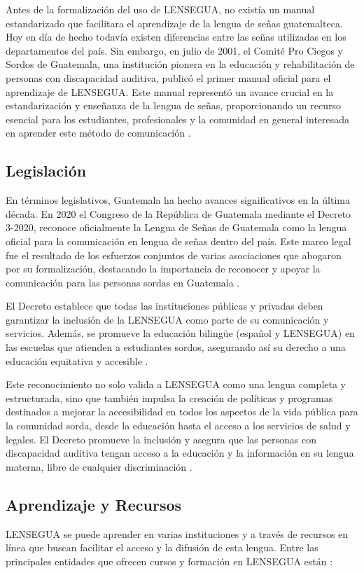 Antes de la formalización del uso de LENSEGUA, no existía un manual estandarizado que facilitara el aprendizaje de la lengua de señas guatemalteca. Hoy en día de hecho todavía existen diferencias entre las señas utilizadas en los departamentos del país. Sin embargo, en julio de 2001, el Comité Pro Ciegos y Sordos de Guatemala, una institución pionera en la educación y rehabilitación de personas con discapacidad auditiva, publicó el primer manual oficial para el aprendizaje de LENSEGUA. Este manual representó un avance crucial en la estandarización y enseñanza de la lengua de señas, proporcionando un recurso esencial para los estudiantes, profesionales y la comunidad en general interesada en aprender este método de comunicación \cite{deLeon2021}.

\subsection{Legislación}
En términos legislativos, Guatemala ha hecho avances significativos en la última década. En 2020 el Congreso de la República de Guatemala mediante el Decreto 3-2020, reconoce oficialmente la Lengua de Señas de Guatemala como la lengua oficial para la comunicación en lengua de señas dentro del país. Este marco legal fue el resultado de los esfuerzos conjuntos de varias asociaciones que abogaron por su formalización, destacando la importancia de reconocer y apoyar la comunicación para las personas sordas en Guatemala \cite{CongresoGuatemala2020} .

El Decreto establece que todas las instituciones públicas y privadas deben garantizar la inclusión de la LENSEGUA como parte de su comunicación y servicios. Además, se promueve la educación bilingüe (español y LENSEGUA) en las escuelas que atienden a estudiantes sordos, asegurando así su derecho a una educación equitativa y accesible \cite{CongresoGuatemala2020}.

Este reconocimiento no solo valida a LENSEGUA como una lengua completa y estructurada, sino que también impulsa la creación de políticas y programas destinados a mejorar la accesibilidad en todos los aspectos de la vida pública para la comunidad sorda, desde la educación hasta el acceso a los servicios de salud y legales. El Decreto promueve la inclusión y asegura que las personas con discapacidad auditiva tengan acceso a la educación y la información en su lengua materna, libre de cualquier discriminación \cite{CongresoGuatemala2020}.

\subsection{Aprendizaje y Recursos}
LENSEGUA se puede aprender en varias instituciones y a través de recursos en línea que buscan facilitar el acceso y la difusión de esta lengua. Entre las principales entidades que ofrecen cursos y formación en LENSEGUA están \cite{LenseguaSF}:

